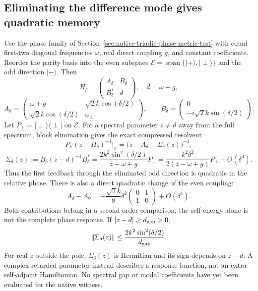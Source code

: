 \documentclass[11pt,a4paper]{article}
\begin{document}
\subsection{Eliminating the difference mode gives quadratic memory}
Use the phase family of Section~\ref{sec:native-triadic-phase-metric-test}
with equal first-two diagonal frequencies $\omega$, real direct coupling
$g$, and constant coefficients. Reorder the parity basis into the even
subspace $\mathcal E=\operatorname{span}\{|+\rangle,|\perp\rangle\}$
and the odd direction $|-\rangle$. Then
\[
 H_\delta=\begin{pmatrix}A_\delta&B_\delta\\B_\delta^*&d\end{pmatrix},
 \quad d=\omega-g,
\]
\[
 A_\delta=\begin{pmatrix}
 \omega+g&\sqrt2 k\cos(\delta/2)\\
 \sqrt2 k\cos(\delta/2)&\omega_\perp
 \end{pmatrix},\qquad
 B_\delta=\begin{pmatrix}0\\-i\sqrt2 k\sin(\delta/2)\end{pmatrix}.
\]
Let $P_\perp=|\perp\rangle\langle\perp|$ on $\mathcal E$. For a
spectral parameter $z\ne d$ away from the full spectrum, block elimination
gives the exact compressed resolvent
\[
 P_{\mathcal E}(z-H_\delta)^{-1}|_{\mathcal E}
 =\bigl(z-A_\delta-\Sigma_\delta(z)\bigr)^{-1},
\]
\[
 \Sigma_\delta(z)
 :=B_\delta(z-d)^{-1}B_\delta^*
 =\frac{2k^2\sin^2(\delta/2)}{z-\omega+g}P_\perp
 =\frac{k^2\delta^2}{2(z-\omega+g)}P_\perp+O(\delta^4).
\]
Thus the first feedback through the eliminated odd direction is
quadratic in the relative phase. There is also a direct quadratic change
of the even coupling:
\[
 A_\delta-A_0
 =-\frac{\sqrt2 k}{8}\delta^2
 \begin{pmatrix}0&1\\1&0\end{pmatrix}+O(\delta^4).
\]
Both contributions belong in a second-order comparison; the self-energy
alone is not the complete phase response. If $|z-d|\ge d_{\rm gap}>0$,
\[
 \|\Sigma_\delta(z)\|
 \le\frac{2k^2\sin^2(\delta/2)}{d_{\rm gap}}.
\]
For real $z$ outside the pole, $\Sigma_\delta(z)$ is Hermitian and its
sign depends on $z-d$. A complex retarded parameter instead describes
a response function, not an extra self-adjoint Hamiltonian. No spectral
gap or modal coefficients have yet been evaluated for the native witness.
\end{document}
